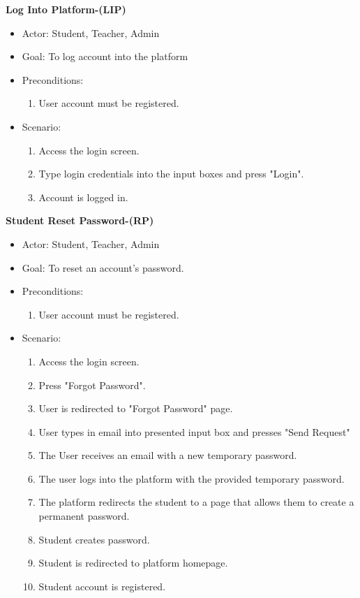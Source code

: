 \documentclass[letterpaper,12pt,oneside,listof=totoc]{scrreprt}
\begin{document}
\hfill \break
\textbf{Log Into Platform-(LIP)}
\begin{itemize}
    \item Actor: Student, Teacher, Admin
    \item Goal: To log account into the platform
    \item Preconditions:
    \begin{enumerate}
        \item User account must be registered.
    \end{enumerate}
    \item Scenario:
    \begin{enumerate}
        \item Access the login screen.
        \item Type login credentials into the input boxes and press "Login".
        \item Account is logged in.
    \end{enumerate}
\end{itemize}

\hfill \break
\textbf{Student Reset Password-(RP)}
\begin{itemize}
    \item Actor: Student, Teacher, Admin
    \item Goal: To reset an account's password.
    \item Preconditions:
    \begin{enumerate}
        \item User account must be registered.
    \end{enumerate}
    \item Scenario:
    \begin{enumerate}
        \item Access the login screen.
        \item Press "Forgot Password".
        \item User is redirected to "Forgot Password" page.
        \item User types in email into presented input box and presses "Send Request"
        \item The User receives an email with a new temporary password.
        \item The user logs into the platform with the provided temporary password.
        \item The platform redirects the student to a page that allows them to create a permanent password.
        \item Student creates password.
        \item Student is redirected to platform homepage.
        \item Student account is registered.
    \end{enumerate}
\end{itemize}
\end{document}
